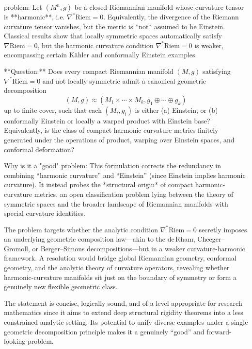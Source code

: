 problem:  
Let $(M^n, g)$ be a closed Riemannian manifold whose curvature tensor is **harmonic**, i.e. $\nabla^* \mathrm{Riem} = 0$. Equivalently, the divergence of the Riemann curvature tensor vanishes, but the metric is *not* assumed to be Einstein. Classical results show that locally symmetric spaces automatically satisfy $\nabla \mathrm{Riem} = 0$, but the harmonic curvature condition $\nabla^*\mathrm{Riem} = 0$ is weaker, encompassing certain Kähler and conformally Einstein examples.  

**Question:**  
Does every compact Riemannian manifold $(M,g)$ satisfying $\nabla^*\mathrm{Riem}=0$ and not locally symmetric admit a canonical geometric decomposition  
\[
(M,g) \approx (M_1 \times \cdots \times M_k, g_1 \oplus \cdots \oplus g_k)
\]
up to finite cover, such that each $(M_i, g_i)$ is either (a) Einstein, or (b) conformally Einstein or locally a warped product with Einstein base?  
Equivalently, is the class of compact harmonic-curvature metrics finitely generated under the operations of product, warping over Einstein spaces, and conformal deformation?  

Why is it a "good" problem:  
This formulation corrects the redundancy in combining “harmonic curvature” and “Einstein” (since Einstein implies harmonic curvature). It instead probes the *structural origin* of compact harmonic-curvature metrics, an open classification problem lying between the theory of symmetric spaces and the broader landscape of Riemannian manifolds with special curvature identities.  

The problem targets whether the analytic condition $\nabla^*\mathrm{Riem} = 0$ secretly imposes an underlying geometric composition law—akin to the de Rham, Cheeger–Gromoll, or Berger–Simons decompositions—but in a weaker curvature-harmonic framework.  
A resolution would bridge global Riemannian geometry, conformal geometry, and the analytic theory of curvature operators, revealing whether harmonic-curvature manifolds sit just on the boundary of symmetry or form a genuinely new flexible geometric class.  

The statement is concise, logically sound, and of a level appropriate for research mathematics since it aims to extend deep structural rigidity theorems into a less constrained analytic setting. Its potential to unify diverse examples under a single geometric decomposition principle makes it a genuinely “good” and forward-looking problem.